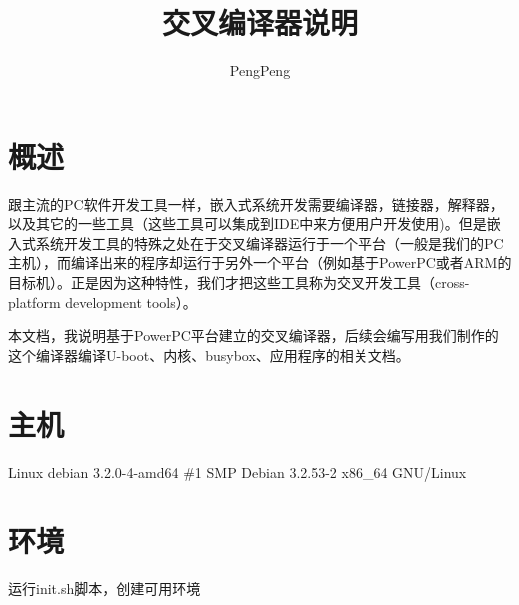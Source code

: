 \documentclass[12pt,a4paper]{article}
\title{交叉编译器说明}
\author{PengPeng}
\begin{document}
\maketitle
\tableofcontents
\newpage

\section{概述}
跟主流的PC软件开发工具一样，嵌入式系统开发需要编译器，链接器，解释器，以及其它的一些工具（这些工具可以集成到IDE中来方便用户开发使用)。但是嵌入式系统开发工具的特殊之处在于交叉编译器运行于一个平台（一般是我们的PC主机），而编译出来的程序却运行于另外一个平台（例如基于PowerPC或者ARM的目标机）。正是因为这种特性，我们才把这些工具称为交叉开发工具（cross-platform development tools）。

本文档，我说明基于PowerPC平台建立的交叉编译器，后续会编写用我们制作的这个编译器编译U-boot、内核、busybox、应用程序的相关文档。
\newpage

\section{主机}
Linux debian 3.2.0-4-amd64 \#1 SMP Debian 3.2.53-2 x86\_64 GNU/Linux
\section{环境}
运行init.sh脚本，创建可用环境
\end{document}
